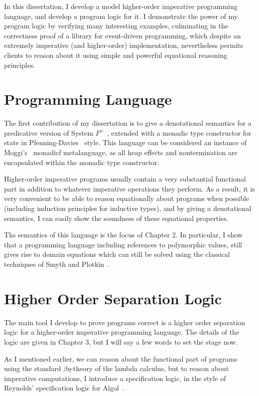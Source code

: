 In this dissertation, I develop a model higher-order imperative
programming language, and develop a program logic for it. I
demonstrate the power of my program logic by verifying many
interesting examples, culminating in the correctness proof of a
library for event-driven programming, which despite an extremely
imperative (and higher-order) implementation, nevertheless permits
clients to reason about it using simple and powerful equational
reasoning principles.

\section{Programming Language}

The first contribution of my dissertation is to give a denotational
semantics for a predicative version of System
$F^\omega$~\cite{girard-thesis}, extended with a monadic type constructor for
state in Pfenning-Davies~\cite{pfenning-davies} style. This language
can be considered an instance of Moggi's~\cite{moggi-monads} monadicf
metalanguage, as all heap effects and nontermination are encapsulated
within the monadic type constructor.

Higher-order imperative programs usually contain a very substantial
functional part in addition to whatever imperative operations they
perform. As a result, it is very convenient to be able to reason
equationally about programs when possible (including induction
principles for inductive types), and by giving a denotational
semantics, I can easily show the soundness of these equational
properties.

Ths semantics of this language is the focus of Chapter 2. In
particular, I show that a programming language including references to
polymorphic values, still gives rise to domain equations which can
still be solved using the classical techniques of Smyth and
Plotkin~\cite{smyth-plotkin}.

\section{Higher Order Separation Logic}

The main tool I develop to prove programs correct is a higher order
separation logic for a higher-order imperative programming
language. The details of the logic are given in Chapter 3, but 
I will say a few words to set the stage now. 

As I mentioned earlier, we can reason about the functional part of
programs using the standard $\beta\eta$-theory of the lambda calculus,
but to reason about imperative computations, I introduce a
specification logic, in the style of Reynolds' specification logic for
Algol~\citep{spec-logic}.

